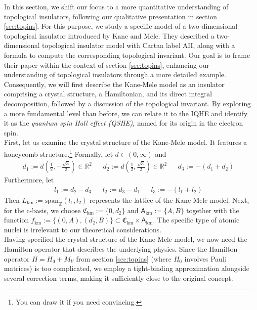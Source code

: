\nocite{04d6b664}
\nocite{6ab9663f}
\nocite{f6db8935}
\nocite{fa76af21}
In this section, we shift our focus to a more quantitative understanding of topological insulators, following our qualitative presentation in section \ref{sec:topins}.
For this purpose, we study a specific model of a two-dimensional topological insulator introduced by Kane and Mele.
They described a two-dimensional topological insulator model with Cartan label AII, along with a formula to compute the corresponding topological invariant.
Our goal is to frame their paper \cite{04d6b664} within the context of section \ref{sec:topins}, enhancing our understanding of topological insulators through a more detailed example.
Consequently, we will first describe the Kane-Mele model as an insulator comprising a crystal structure, a Hamiltonian, and its direct integral decomposition, followed by a discussion of the topological invariant.
By exploring a more fundamental level than before, we can relate it to the IQHE and identify it as the \textit{quantum spin Hall effect (QSHE)}, named for its origin in the electron spin.
\\
First, let us examine the crystal structure of the Kane-Mele model.
It features a {\glqq}honeycomb{\grqq} structure.\footnote{You can draw it if you need convincing.} Formally, let $d \in (0,\infty)$ and
\begin{align*}
  d_{1}
  :=
  d
  \left(
    \frac{1}{2},
    -\frac{\sqrt{3}}{2}
  \right)
  \in
  \mathbb{R}^{2}
  &&
  d_{2}
  :=
  d
  \left(
    \frac{1}{2},
    \frac{\sqrt{3}}{2}
  \right)
  \in
  \mathbb{R}^{2}
  &&
  d_{3}
  :=
  -
  (d_{1} + d_{2})
\end{align*}
Furthermore, let
\begin{align*}
  l_{1}
  :=
  d_{2}
  -
  d_{3}
  &&
  l_{2}
  :=
  d_{3}
  -
  d_{1}
  &&
  l_{3}
  :=
  -
  (l_{1}+l_{2})
\end{align*}
Then $L_{\textrm{km}} := \mathrm{span}_{\mathbb{Z}}(l_{1},l_{2})$ represents the lattice of the Kane-Mele model.
Next, for the c-basis, we choose $\mathfrak{C}_{\textrm{km}} := \lbrace 0,d_{2} \rbrace$ and $\mathsf{A}_{\textrm{km}} := \lbrace A,B \rbrace$ together with the function $f_{\textrm{km}} := \lbrace (0,A),(d_{2},B) \rbrace \subset \mathfrak{C}_{\textrm{km}} \times \mathsf{A}_{\textrm{km}}$.
The specific type of atomic nuclei is irrelevant to our theoretical considerations.
\\
Having specified the crystal structure of the Kane-Mele model, we now need the Hamilton operator that describes the underlying physics.
Since the Hamilton operator $H = H_{0} + M_{V}$ from section \ref{sec:topins} (where $H_{0}$ involves Pauli matrices) is too complicated, we employ a {\glqq}tight-binding approximation{\grqq} alongside several correction terms, making it sufficiently close to the original concept.
